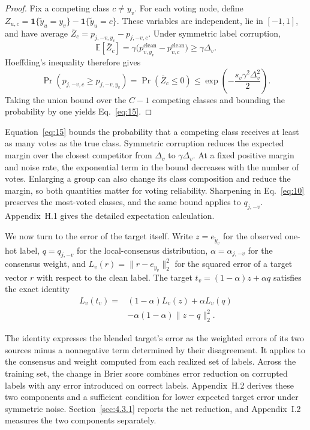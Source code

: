 \documentclass[10pt,letterpaper,nopreprintline]{elsarticle}
\theoremstyle{plain}
\begin{document}
\begin{proof}
Fix a competing class \(c\ne y_v\). For each voting node, define \(Z_{u,c}=\mathbf{1}\{\widetilde y_u=y_v\}-\mathbf{1}\{\widetilde y_u=c\}\). These variables are independent, lie in \([-1,1]\), and have average \(\bar Z_c=p_{j,-v,y_v}-p_{j,-v,c}\). Under symmetric label corruption,
\[
\mathbb E[\bar Z_c]=\gamma\bigl(p^{\mathrm{clean}}_{v,y_v}-p^{\mathrm{clean}}_{v,c}\bigr)\geq\gamma\Delta_v.
\]
Hoeffding's inequality \cite{hoeffding1963} therefore gives
\[
\Pr\!\left(p_{j,-v,c}\geq p_{j,-v,y_v}\right)
=\Pr(\bar Z_c\leq0)
\leq\exp\!\left(-\frac{s_v\gamma^2\Delta_v^2}{2}\right).
\]
Taking the union bound over the \(C-1\) competing classes and bounding the probability by one yields Eq.~\eqref{eq:15}.
\end{proof}

Equation~\eqref{eq:15} bounds the probability that a competing class receives at least as many votes as the true class. Symmetric corruption reduces the expected margin over the closest competitor from \(\Delta_v\) to \(\gamma\Delta_v\). At a fixed positive margin and noise rate, the exponential term in the bound decreases with the number of votes. Enlarging a group can also change its class composition and reduce the margin, so both quantities matter for voting reliability. Sharpening in Eq.~\eqref{eq:10} preserves the most-voted classes, and the same bound applies to \(q_{j,-v}\). Appendix~H.1 gives the detailed expectation calculation.

\Needspace{100pt}
We now turn to the error of the target itself. Write \(z=e_{\widetilde y_v}\) for the observed one-hot label, \(q=q_{j,-v}\) for the local-consensus distribution, \(\alpha=\alpha_{j,-v}\) for the consensus weight, and \(L_v(r)=\lVert r-e_{y_v}\rVert_2^2\) for the squared error of a target vector \(r\) with respect to the clean label. The target \(t_v=(1-\alpha)z+\alpha q\) satisfies the exact identity
\begin{equation}\label{eq:16}
\begin{aligned}
L_v(t_v)={}&(1-\alpha)L_v(z)+\alpha L_v(q)\\
&-\alpha(1-\alpha)\lVert z-q\rVert_2^2.
\end{aligned}
\end{equation}

The identity expresses the blended target's error as the weighted errors of its two sources minus a nonnegative term determined by their disagreement. It applies to the consensus and weight computed from each realized set of labels. Across the training set, the change in Brier score combines error reduction on corrupted labels with any error introduced on correct labels. Appendix~H.2 derives these two components and a sufficient condition for lower expected target error under symmetric noise. Section~\ref{sec:4.3.1} reports the net reduction, and Appendix~I.2 measures the two components separately.
\end{document}
